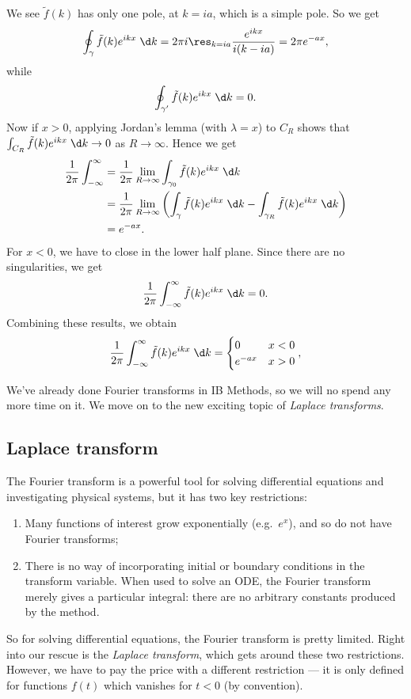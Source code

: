 \documentclass[a4paper]{article}
\begin{document}
\begin{eg}
\begin{center}
  \end{center}
  We see $\tilde{f}(k)$ has only one pole, at $k = ia$, which is a simple pole. So we get
  \[
    \oint_\gamma \tilde{f}(k) e^{ikx} \;\d k = 2\pi i \res_{k = ia} \frac{e^{ikx}}{i(k - ia)} = 2\pi e^{-ax},
  \]
  while
  \[
    \oint_{\gamma'}\tilde{f}(k) e^{ikx} \;\d k = 0.
  \]
  Now if $x > 0$, applying Jordan's lemma (with $\lambda = x$) to $C_R$ shows that $\int_{C_R} \tilde{f}(k) e^{ikx}\;\d k \to 0$ as $R \to \infty$. Hence we get
  \begin{align*}
    \frac{1}{2\pi} \int_{-\infty}^\infty &= \frac{1}{2\pi} \lim_{R \to \infty}\int_{\gamma_0}\tilde{f}(k) e^{ikx}\;\d k\\
    &= \frac{1}{2\pi} \lim_{R \to \infty}\left(\int_\gamma\tilde{f}(k) e^{ikx}\;\d k - \int_{\gamma_R}\tilde{f}(k) e^{ikx}\;\d k\right)\\
    &= e^{-ax}.
  \end{align*}
  For $x < 0$, we have to close in the lower half plane. Since there are no singularities, we get
  \[
    \frac{1}{2\pi} \int_{-\infty}^\infty \tilde{f}(k) e^{ikx}\;\d k = 0.
  \]
  Combining these results, we obtain
  \[
    \frac{1}{2\pi} \int_{-\infty}^\infty \tilde{f}(k) e^{ikx}\;\d k =
    \begin{cases}
      0 & x < 0\\
      e^{-ax} & x > 0
    \end{cases},
  \]
\end{eg}
We've already done Fourier transforms in IB Methods, so we will no spend any more time on it. We move on to the new exciting topic of \emph{Laplace transforms}.

\subsection{Laplace transform}
The Fourier transform is a powerful tool for solving differential equations and investigating physical systems, but it has two key restrictions:
\begin{enumerate}
  \item Many functions of interest grow exponentially (e.g.\ $e^x$), and so do not have Fourier transforms;
  \item There is no way of incorporating initial or boundary conditions in the transform variable. When used to solve an ODE, the Fourier transform merely gives a particular integral: there are no arbitrary constants produced by the method.
\end{enumerate}
So for solving differential equations, the Fourier transform is pretty limited. Right into our rescue is the \emph{Laplace transform}, which gets around these two restrictions. However, we have to pay the price with a different restriction --- it is only defined for functions $f(t)$ which vanishes for $t < 0$ (by convention).
\end{document}
